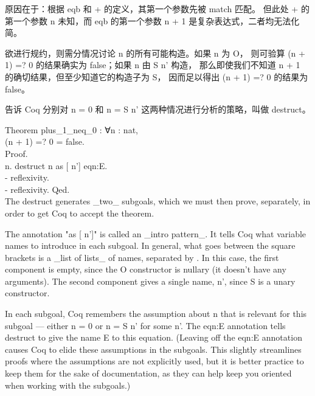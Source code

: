 \documentclass[utf8]{ctexart}
\begin{document}
原因在于：根据 {{eqb}} 和 {+} 的定义，其第一个参数先被 {{match}} 匹配。
但此处 {+} 的第一个参数 {{n}} 未知，而 {{eqb}} 的第一个参数 {{n}} {+}
{1} 是复杂表达式，二者均无法化简。

欲进行规约，则需分情况讨论 {{n}} 的所有可能构造。如果 {{n}} 为 {{O}}，
则可验算 {({n}} {+} {1)} {=?} {0} 的结果确实为 {{false}}；如果 {{n}} 由
{{S}} {{n'}} 构造， 那么即使我们不知道 {{n}} {+} {1}
的确切结果，但至少知道它的构造子为 {{S}}， 因而足以得出 {({n}} {+} {1)}
{=?} {0} 的结果为 {{false}}。

告诉 Coq 分别对 {{n}} {=} {0} 和 {{n}} {=} {{S}} {{n'}}
这两种情况进行分析的策略，叫做 {{destruct}}。

{Theorem} {plus\_1\_neq\_0} : {∀}{n} : {nat},\\
\hspace*{0.333em}\hspace*{0.333em}({n} + 1) =? 0 = {false}.\\
{Proof}.\\
\hspace*{0.333em}\hspace*{0.333em}{intros} {n}. {destruct} {n} {as}
{[}\textbar{} {n'}{]} {eqn}:{E}.\\
\hspace*{0.333em}\hspace*{0.333em}- {reflexivity}.\\
\hspace*{0.333em}\hspace*{0.333em}- {reflexivity}. {Qed}.\\

The {{destruct}} generates \_two\_ subgoals, which we must then prove,
separately, in order to get Coq to accept the theorem.

The annotation "{{as}} {{[}\textbar{}} {{n'}{]}}" is called an \_intro
pattern\_. It tells Coq what variable names to introduce in each
subgoal. In general, what goes between the square brackets is a \_list
of lists\_ of names, separated by {\textbar{}}. In this case, the first
component is empty, since the {{O}} constructor is nullary (it doesn't
have any arguments). The second component gives a single name, {{n'}},
since {{S}} is a unary constructor.

In each subgoal, Coq remembers the assumption about {{n}} that is
relevant for this subgoal --- either {{n}} {=} {0} or {{n}} {=} {{S}}
{{n'}} for some n'. The {{eqn}:{E}} annotation tells {{destruct}} to
give the name {{E}} to this equation. (Leaving off the {{eqn}:{E}}
annotation causes Coq to elide these assumptions in the subgoals. This
slightly streamlines proofs where the assumptions are not explicitly
used, but it is better practice to keep them for the sake of
documentation, as they can help keep you oriented when working with the
subgoals.)
\end{document}
